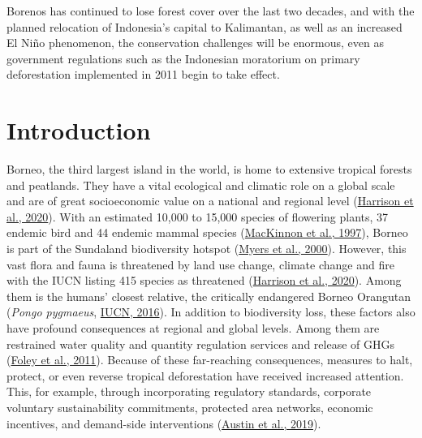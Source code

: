 \documentclass[
  letterpaper,
  DIV=11,
  numbers=noendperiod]{scrreprt}
\begin{document}
Borenos has continued to lose forest cover over the last two decades,
and with the planned relocation of Indonesia's capital to Kalimantan, as
well as an increased El Niño phenomenon, the conservation challenges
will be enormous, even as government regulations such as the Indonesian
moratorium on primary deforestation implemented in 2011 begin to take
effect.

\newpage
\tableofcontents


\hypertarget{sec-introduction}{%
\chapter{Introduction}\label{sec-introduction}}

Borneo, the third largest island in the world, is home to extensive
tropical forests and peatlands. They have a vital ecological and
climatic role on a global scale and are of great socioeconomic value on
a national and regional level
(\protect\hyperlink{ref-harrisonTropicalForestPeatland2020}{Harrison et
al., 2020}). With an estimated 10,000 to 15,000 species of flowering
plants, 37 endemic bird and 44 endemic mammal species
(\protect\hyperlink{ref-mackinnonEcologyKalimantan1997}{MacKinnon et
al., 1997}), Borneo is part of the Sundaland biodiversity hotspot
(\protect\hyperlink{ref-myersBiodiversityHotspotsConservation2000}{Myers
et al., 2000}). However, this vast flora and fauna is threatened by land
use change, climate change and fire with the IUCN listing 415 species as
threatened
(\protect\hyperlink{ref-harrisonTropicalForestPeatland2020}{Harrison et
al., 2020}). Among them is the humans' closest relative, the critically
endangered Borneo Orangutan (\emph{Pongo pygmaeus},
\protect\hyperlink{ref-iucnPongoPygmaeusAncrenaz2016}{IUCN, 2016}). In
addition to biodiversity loss, these factors also have profound
consequences at regional and global levels. Among them are restrained
water quality and quantity regulation services and release of GHGs
(\protect\hyperlink{ref-foleySolutionsCultivatedPlanet2011}{Foley et
al., 2011}). Because of these far-reaching consequences, measures to
halt, protect, or even reverse tropical deforestation have received
increased attention. This, for example, through incorporating regulatory
standards, corporate voluntary sustainability commitments, protected
area networks, economic incentives, and demand-side interventions
(\protect\hyperlink{ref-austinWhatCausesDeforestation2019}{Austin et
al., 2019}).
\end{document}
